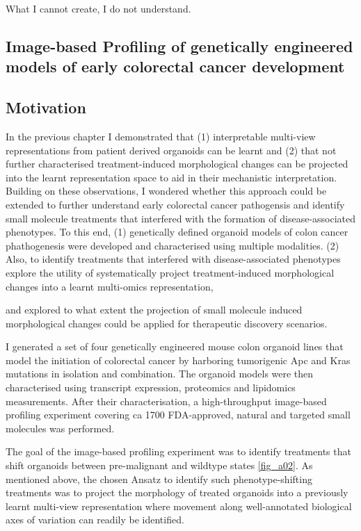 \begin{savequote}[75mm]
What I cannot create, I do not understand.
\end{savequote}

\begin{flushleft}
\chapter{Image-based Profiling of genetically engineered models of early colorectal cancer development}

\section{Motivation}

In the previous chapter I demonstrated that (1) interpretable multi-view representations from patient derived organoids can be learnt and (2) that not further characterised treatment-induced morphological changes can be projected into the learnt representation space to aid in their mechanistic interpretation. Building on these observations, I wondered whether this approach could be extended to further understand early colorectal cancer pathogensis and identify small molecule treatments that interfered with the formation of disease-associated phenotypes. To this end, (1) genetically defined organoid models of colon cancer phathogenesis were developed and characterised using multiple modalities. (2) Also, to identify treatments that interfered with disease-associated phenotypes explore the utility of systematically project treatment-induced morphological changes into a learnt multi-omics representation,  

and explored to what extent the projection of small molecule induced morphological changes could be applied for therapeutic discovery scenarios. 

I generated a set of four genetically engineered mouse colon organoid lines that model the initiation of colorectal cancer by harboring tumorigenic Apc and Kras mutations in isolation and combination. The organoid models were then characterised using transcript expression, proteomics and lipidomics measurements. After their characterisation, a high-throughput image-based profiling experiment covering ca 1700 FDA-approved, natural and targeted small molecules was performed.

The goal of the image-based profiling experiment was to identify treatments that shift organoids between pre-malignant and wildtype states \ref{fig_a02}. As mentioned above, the chosen Ansatz to identify such phenotype-shifting treatments was to project the morphology of treated organoids into a previously learnt multi-view representation where movement along well-annotated biological axes of variation can readily be identified.  


\end{flushleft}
